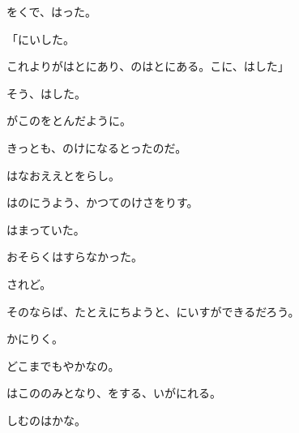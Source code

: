 \documentclass{article}        %
\begin{document}
\begin{CJK}{UTF8}{min}
をくで、はった。

「にいした。

これよりがはとにあり、のはとにある。こに、はした」

そう、はした。

がこのをとんだように。

きっとも、のけになるとったのだ。

はなおええとをらし。

はのにうよう、かつてのけさをりす。

はまっていた。

おそらくはすらなかった。

されど。

そのならば、たとえにちようと、にいすができるだろう。

かにりく。

どこまでもやかなの。

はこののみとなり、をする、いがにれる。

しむのはかな。

\end{CJK}
\end{document}
